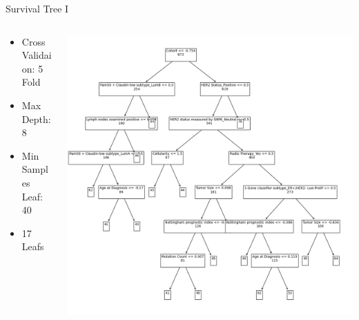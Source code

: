 \documentclass{beamer}
\begin{document}
\begin{frame}{Survival Tree I}
    \begin{columns}
        \begin{column}{0.49 \textwidth}
            \begin{itemize}
                \item Cross Validaion: 5 Fold
                \item Max Depth: 8
                \item Min Samples Leaf: 40
                \item 17 Leafs
            \end{itemize}
        \end{column}
        \begin{column}{0.49 \textwidth}
            \centering
            \includegraphics[width = \textwidth]{images/st_tree.png}
        \end{column}
    \end{columns}
\end{frame}
\end{document}
